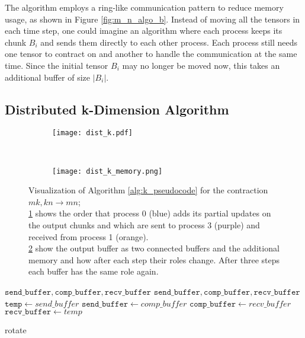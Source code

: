 The algorithm employs a ring-like communication pattern to reduce memory usage, as shown in Figure \ref{fig:m_n_algo_b}.
Instead of moving all the tensors in each time step, one could imagine an algorithm where each process keeps its chunk $B_i$ and sends them directly to each other process.
Each process still needs one tensor to contract on and another to handle the communication at the same time.
Since the initial tensor $B_i$ may no longer be moved now, this takes an additional buffer of size $|B_i|$.

\subsection{Distributed k-Dimension Algorithm}

\begin{figure}[ht]
    \centering
    \begin{subfigure}[t]{0.6\textwidth}
        \centering
        \texttt{[image: dist\_k.pdf]}
        \label{fig:k_algo_a}
    \end{subfigure}
    ~
    \begin{subfigure}[t]{0.35\textwidth}
        \centering\texttt{[image: dist\_k\_memory.png]}
        \label{fig:k_algo_b}
    \end{subfigure}
    \caption{Visualization of Algorithm \ref{alg:k_pseudocode} for the contraction $mk,kn \rightarrow mn$;\\
    \ref{fig:k_algo_a} shows the order that process 0 (blue) adds its partial updates on the output chunks and which are sent to process 3 (purple) and received from process 1 (orange).\\
    \ref{fig:k_algo_b} show the output buffer as two connected buffers and the additional memory and how after each step their roles change.
    After three steps each buffer has the same role again.
    }
    \label{fig:k_algo}
\end{figure}


\begin{algorithm}[ht]
    \begin{algorithmic}
        \Require $\texttt{send\_buffer},\texttt{comp\_buffer},\texttt{recv\_buffer}$
        \Ensure $\texttt{send\_buffer},\texttt{comp\_buffer},\texttt{recv\_buffer}$
        \State $\texttt{temp} \gets {send\_buffer}$
        \State $\texttt{send\_buffer} \gets {comp\_buffer}$
        \State $\texttt{comp\_buffer} \gets {recv\_buffer}$
        \State $\texttt{recv\_buffer} \gets {temp}$
    \end{algorithmic}
    \caption{rotate}
    \label{rotate_pseudocode}
\end{algorithm}

